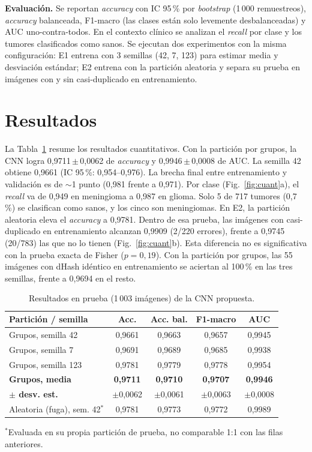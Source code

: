 \documentclass[letterpaper, 10 pt, conference]{ieeeconf}  %
\begin{document}
\textbf{Evaluación.} Se reportan \textit{accuracy} con IC 95\,\% por \textit{bootstrap} (1\,000 remuestreos), \textit{accuracy} balanceada, F1-macro (las clases están solo levemente desbalanceadas) y AUC uno-contra-todos. En el contexto clínico se analizan el \textit{recall} por clase y los tumores clasificados como sanos. Se ejecutan dos experimentos con la misma configuración: E1 entrena con 3 semillas (42, 7, 123) para estimar media y desviación estándar; E2 entrena con la partición aleatoria y separa su prueba en imágenes con y sin casi-duplicado en entrenamiento.

\section{Resultados}
La Tabla~\ref{tab:res} resume los resultados cuantitativos. Con la partición por grupos, la CNN logra 0,9711\,$\pm$\,0,0062 de \textit{accuracy} y 0,9946\,$\pm$\,0,0008 de AUC. La semilla 42 obtiene 0,9661 (IC 95\,\%: 0,954--0,976). La brecha final entre entrenamiento y validación es de $\sim$1 punto (0,981 frente a 0,971). Por clase (Fig.~\ref{fig:cuant}a), el \textit{recall} va de 0,949 en meningioma a 0,987 en glioma. Solo 5 de 717 tumores (0,7\,\%) se clasifican como sanos, y los cinco son meningiomas. En E2, la partición aleatoria eleva el \textit{accuracy} a 0,9781. Dentro de esa prueba, las imágenes con casi-duplicado en entrenamiento alcanzan 0,9909 (2/220 errores), frente a 0,9745 (20/783) las que no lo tienen (Fig.~\ref{fig:cuant}b). Esta diferencia no es significativa con la prueba exacta de Fisher ($p=0{,}19$). Con la partición por grupos, las 55 imágenes con dHash idéntico en entrenamiento se aciertan al 100\,\% en las tres semillas, frente a 0,9694 en el resto.

\begin{table}[t]
\centering
\caption{Resultados en prueba (1\,003 imágenes) de la CNN propuesta.}
\label{tab:res}
\setlength{\tabcolsep}{2.6pt}
\begin{tabular}{|l|c|c|c|c|} \hline
\textbf{Partición / semilla} & \textbf{Acc.} & \textbf{Acc. bal.} & \textbf{F1-macro} & \textbf{AUC} \\\hline
Grupos, semilla 42  & 0,9661 & 0,9663 & 0,9657 & 0,9945 \\\hline
Grupos, semilla 7   & 0,9691 & 0,9689 & 0,9685 & 0,9938 \\\hline
Grupos, semilla 123 & 0,9781 & 0,9779 & 0,9778 & 0,9954 \\\hline
\textbf{Grupos, media} & \textbf{0,9711} & \textbf{0,9710} & \textbf{0,9707} & \textbf{0,9946} \\
\textbf{$\pm$ desv. est.} & $\pm$0,0062 & $\pm$0,0061 & $\pm$0,0063 & $\pm$0,0008 \\\hline
Aleatoria (fuga), sem. 42$^{*}$ & 0,9781 & 0,9773 & 0,9772 & 0,9989 \\\hline
\end{tabular}

\vspace{1mm}
{\scriptsize $^{*}$Evaluada en su propia partición de prueba, no comparable 1:1 con las filas anteriores.}
\end{table}
\end{document}
